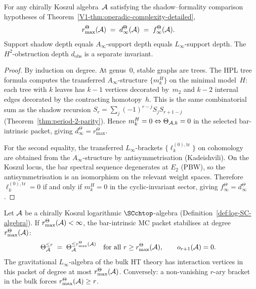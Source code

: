 \begin{theorem}
\label{thm:operadic-complexity}
\ClaimStatusConditional
{}%
%
For any chirally Koszul algebra~$\mathcal{A}$ satisfying the
shadow--formality comparison hypotheses of
Theorem~\textup{\ref*{V1-thm:operadic-complexity-detailed}},
\begin{equation}\label{eq:operadic-complexity-id}
r^\Theta_{\max}(\mathcal{A})
\;=\;
d^\Theta_\infty(\mathcal{A})
\;=\;
f^\Theta_\infty(\mathcal{A}).
\end{equation}
Support shadow depth equals \(A_\infty\)-support depth equals
\(L_\infty\)-support depth.  The \(H^2\)-obstruction depth
\(d_{\mathrm{obs}}\) is a separate invariant.
\end{theorem}

\begin{proof}
By induction on degree. At genus~$0$, stable graphs are trees.
The HPL tree formula computes the transferred $A_\infty$-structure
$\{m_k^H\}$ on the minimal model~$H$: each tree with $k$ leaves has
$k-1$ vertices decorated by~$m_2$ and $k-2$ internal edges
decorated by the contracting homotopy~$h$. This is the same
combinatorial sum as the shadow recursion
$S_r = \sum_{j} (-1)^{r-j} S_j S_{r+1-j}$
(Theorem~\ref{thm:period-2-parity}). Hence
\(m_k^H = 0 \Leftrightarrow \Theta_{\mathcal{A},k}=0\) in the selected
bar-intrinsic packet, giving
\(d^\Theta_\infty = r^\Theta_{\max}\).

For the second equality, the transferred $L_\infty$-brackets
$\{\ell_k^{(0),\mathrm{tr}}\}$ on cohomology are obtained from
the $A_\infty$-structure by antisymmetrisation (Kadeishvili).
On the Koszul locus, the bar spectral sequence degenerates at
$E_2$ (PBW), so the antisymmetrisation is an isomorphism on the
relevant weight spaces. Therefore \(\ell_k^{(0),\mathrm{tr}} = 0\)
if and only if \(m_k^H = 0\) in the cyclic-invariant sector, giving
\(f^\Theta_\infty = d^\Theta_\infty\).
\end{proof}

\begin{theorem}
\ClaimStatusProvedHere
{}
Let $\mathcal{A}$ be a chirally Koszul logarithmic $\SCchtop$-algebra
\textup{(}Definition~\textup{\ref{def:log-SC-algebra}}\textup{)}.
If \(r^\Theta_{\max}(\mathcal{A})<\infty\), the bar-intrinsic MC packet
stabilises at degree \(r^\Theta_{\max}(\mathcal{A})\):
\begin{equation}%
\Theta_\cA^{\leq r}
\;=\;
\Theta_\cA^{\leq r^\Theta_{\max}(\cA)}
\quad \text{for all } r \geq r^\Theta_{\max}(\cA),
\qquad
o_{r+1}(\cA) = 0.
\end{equation}
The gravitational $L_\infty$-algebra of the bulk HT theory
has interaction vertices in this packet of degree at most
\(r^\Theta_{\max}(\mathcal{A})\).
Conversely: a non-vanishing $r$-ary bracket in the bulk
forces \(r^\Theta_{\max}(\mathcal{A}) \geq r\).
\end{theorem}

